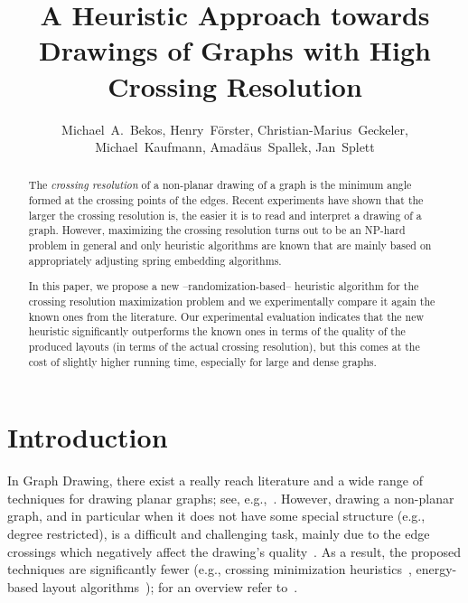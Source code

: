 \documentclass{llncs}
\author{Michael~A.~Bekos, Henry~F\"orster, Christian-Marius~Geckeler, Michael~Kaufmann, Amad\"aus~Spallek, Jan~Splett}
\title{A Heuristic Approach towards Drawings of Graphs with High Crossing Resolution}
\institute{
Wilhelm-Schickhard-Institut f\"ur Informatik, Universit\"at T\"ubingen, Germany\\
\texttt{\{bekos,foersth,mk\}@informatik.uni-tuebingen.de}\\
\texttt{\{christian-marius.geckeler,amadaeus.spallek,jan.splett\}@student.uni-tuebingen.de}
}
\begin{document}
\maketitle

\begin{abstract}
The \emph{crossing resolution} of a non-planar drawing of a graph is the minimum angle formed at the crossing points of the edges. Recent experiments have shown that the larger the crossing resolution is, the easier it is to read and interpret a drawing of a graph. However, maximizing the crossing resolution turns out to be an NP-hard problem in general and only heuristic algorithms are known that are mainly based on appropriately adjusting spring embedding algorithms. 
 
In this paper, we propose a new --randomization-based-- heuristic algorithm for the crossing resolution maximization problem and we experimentally compare it again the known ones from the literature. Our experimental evaluation indicates that the new heuristic significantly outperforms the known ones in terms of the quality of the produced layouts (in terms of the actual crossing resolution), but this comes at the cost of slightly higher running time, especially for large and dense graphs. 
\end{abstract}

\section{Introduction}
\label{sec:introduction}

In Graph Drawing, there exist a really reach literature and a wide range of techniques for drawing planar graphs; see, e.g.,~\cite{DBLP:journals/combinatorica/FraysseixPP90,DBLP:conf/gd/GutwengerM98,DBLP:journals/algorithmica/Kant96}. However, drawing a non-planar graph, and in particular when it does not have some special structure (e.g., degree restricted), is a difficult and challenging task, mainly due to the edge crossings which negatively affect the drawing's quality~\cite{DBLP:journals/iwc/Purchase00}. As a result, the proposed techniques are significantly fewer (e.g., crossing minimization heuristics~\cite{DBLP:journals/algorithmica/EadesW94,DBLP:journals/tsmc/SugiyamaTT81}, energy-based layout algorithms~\cite{DBLP:journals/congnum/Eades84,DBLP:journals/spe/FruchtermanR91}); for an overview refer to~\cite{DBLP:books/ph/BattistaETT99,DBLP:conf/dagstuhl/1999dg,DBLP:reference/crc/2013gd}.
\end{document}
